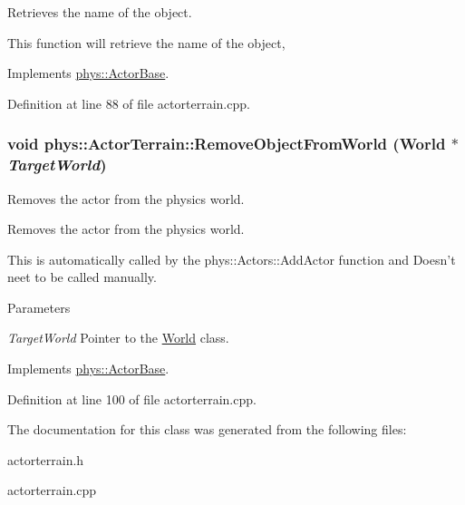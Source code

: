 Retrieves the name of the object. 

This function will retrieve the name of the object, 

Implements \hyperlink{classphys_1_1ActorBase_a8309f5bd133c936abe3a856b0240159f}{phys::ActorBase}.



Definition at line 88 of file actorterrain.cpp.

\hypertarget{classphys_1_1ActorTerrain_aeded1fdabfc4dd407f81fcc5b97c1f77}{
\subsubsection[{RemoveObjectFromWorld}]{\setlength{\rightskip}{0pt plus 5cm}void phys::ActorTerrain::RemoveObjectFromWorld ({\bf World} $\ast$ {\em TargetWorld})}}
\label{de/d74/classphys_1_1ActorTerrain_aeded1fdabfc4dd407f81fcc5b97c1f77}


Removes the actor from the physics world. 

Removes the actor from the physics world. \par
 This is automatically called by the phys::Actors::AddActor function and Doesn't neet to be called manually. 
\begin{DoxyParams}{Parameters}
\item[{\em TargetWorld}]Pointer to the \hyperlink{classphys_1_1World}{World} class. \end{DoxyParams}


Implements \hyperlink{classphys_1_1ActorBase_aaa787de7ec5d7d1d8428ea78f37bcb40}{phys::ActorBase}.



Definition at line 100 of file actorterrain.cpp.



The documentation for this class was generated from the following files:\begin{DoxyCompactItemize}
\item 
actorterrain.h\item 
actorterrain.cpp\end{DoxyCompactItemize}

